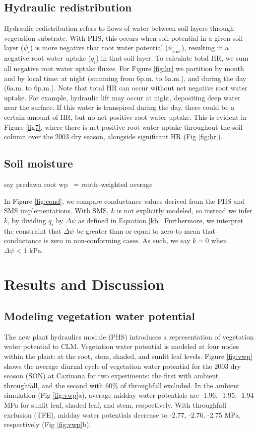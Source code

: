\documentclass[draft,linenumbers]{agujournal}
\begin{document}
        
\subsection{Hydraulic redistribution}
Hydraulic redistribution refers to flows of water between soil layers through vegetation substrate.
With PHS, this occurs when soil potential in a given soil layer ($\psi_i$) is more negative that root water potential ($\psi_{\text{root}}$), resulting in a negative root water uptake ($q_i$) in that soil layer.
To calculate total HR, we sum all negative root water uptake fluxes.
For Figure \ref{fig:hr} we partition by month and by local time: at night (summing from 6p.m. to 6a.m.), and during the day (6a.m. to 6p.m.).
Note that total HR can occur without net negative root water uptake.
For example, hydraulic lift may occur at night, depositing deep water near the surface.
If this water is transpired during the day, there could be a certain amount of HR, but no net positive root water uptake.
This is evident in Figure \ref{fig7}, where there is net positive root water uptake throughout the soil column over the 2003 dry season, alongside significant HR (Fig \ref{fig:hr}).

\subsection{Soil moisture}
say predawn root wp ~= rootfr-weighted average


    In Figure \ref{fig:cond}, we compare conductance values derived from the PHS and SMS implementations.
    With SMS, $k$ is not explicitly modeled, so instead we infer $k$, 
    by dividing $q_i$ by $\Delta\psi$ as defined in Equation \ref{kb}.
    Furthermore, we interpret the constraint that $\Delta\psi$ be greater than or equal to zero to mean 
    that conductance is zero in non-conforming cases. As such, we say $k=0$ when $\Delta\psi<\text{1 kPa}$.
    

    
\section{Results and Discussion}
\subsection{Modeling vegetation water potential}
    
    The new plant hydraulics module (PHS) introduces a representation of vegetation water potential to CLM.
    Vegetation water potential is modeled at four nodes within the plant: at the root, stem, shaded, and sunlit leaf levels.
    Figure \ref{fig:vwp} shows the average diurnal cycle of vegetation water potential for the 2003 dry season (SON)
    at Caxiuana for two experiments: the first with ambient throughfall, and the second with 60\% of throughfall excluded. 
    In the ambient simulation (Fig \ref{fig:vwp}a), average midday water potentials are -1.96, -1.95, -1.94 MPa for sunlit leaf, shaded leaf, and stem, respectively.
    With throughfall exclusion (TFE), midday water potentials decrease to -2.77, -2.76, -2.75 MPa, respectively (Fig \ref{fig:vwp}b).
    
\end{document}
